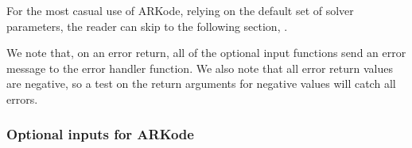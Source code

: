 \documentclass[letterpaper,10pt,english]{sphinxmanual}
\begin{document}
For the most casual use of ARKode, relying on the default set of
solver parameters, the reader can skip to the following section,
{\hyperref[c_interface/User_supplied:cinterface-usersupplied]{\emph{}}}.

We note that, on an error return, all of the optional input functions
send an error message to the error handler function.  We also note
that all error return values are negative, so a test on the return
arguments for negative values will catch all errors.


\subsubsection{Optional inputs for ARKode}
\label{c_interface/User_callable:cinterface-arkodeinputtable}\label{c_interface/User_callable:optional-inputs-for-arkode}
\end{document}
